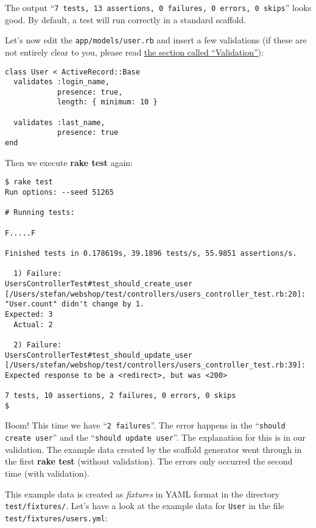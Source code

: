 \documentclass[a4paper]{book}
\begin{document}
The output “\texttt{7 tests, 13 assertions, 0 failures, 0 errors, 0     skips}” looks good. By default, a test will run correctly in a standard scaffold.

Let's now edit the \texttt{app/models/user.rb} and insert a few validations (if these are not entirely clear to you, please read \hyperref[activerecordux5fvalidation]{the section called “Validation”}):

\begin{shaded}\begin{verbatim}
class User < ActiveRecord::Base
  validates :login_name,
            presence: true,
            length: { minimum: 10 }

  validates :last_name,
            presence: true
end
\end{verbatim}\end{shaded}

Then we execute \textbf{rake test} again:

\begin{shaded}\begin{verbatim}
$ rake test
Run options: --seed 51265

# Running tests:

F.....F

Finished tests in 0.178619s, 39.1896 tests/s, 55.9851 assertions/s.

  1) Failure:
UsersControllerTest#test_should_create_user [/Users/stefan/webshop/test/controllers/users_controller_test.rb:20]:
"User.count" didn't change by 1.
Expected: 3
  Actual: 2

  2) Failure:
UsersControllerTest#test_should_update_user [/Users/stefan/webshop/test/controllers/users_controller_test.rb:39]:
Expected response to be a <redirect>, but was <200>

7 tests, 10 assertions, 2 failures, 0 errors, 0 skips
$
\end{verbatim}\end{shaded}

Boom! This time we have “\texttt{2 failures}”. The error happens in the “\texttt{should create user}” and the “\texttt{should update user}”. The explanation for this is in our validation. The example data created by the scaffold generator went through in the first \textbf{rake test} (without validation). The errors only occurred the second time (with validation).

This example data is created as \emph{fixtures} in YAML format in the directory \texttt{test/fixtures/}. Let's have a look at the example data for \texttt{User} in the file \texttt{test/fixtures/users.yml}:
\end{document}
